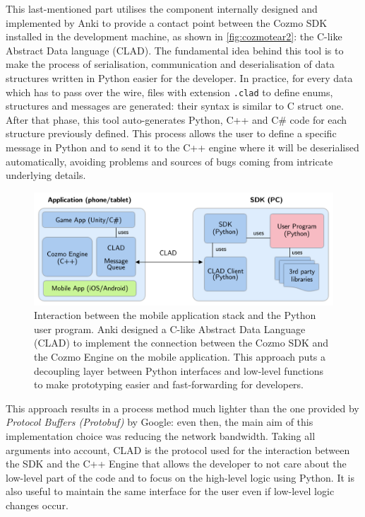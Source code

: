 This last-mentioned part utilises the component internally designed and implemented by Anki to provide a contact point between the Cozmo SDK installed in the development machine, as shown in \vref{fig:cozmotear2}: the C-like Abstract Data language (CLAD).
The fundamental idea behind this tool is to make the process of serialisation, communication and deserialisation of data structures written in Python easier for the developer.
In practice, for every data which has to pass over the wire, files with extension \texttt{.clad} to define enums, structures and messages are generated: their syntax is similar to C struct one.
After that phase, this tool auto-generates Python, C++ and C\# code for each structure previously defined.
This process allows the user to define a specific message in Python and to send it to the C++ engine where it will be deserialised automatically, avoiding problems and sources of bugs coming from intricate underlying details.

\begin{figure}
	\centering
	\includegraphics[width=\textwidth]{img/cozmo-sw.png}
	\caption[Interaction Application/PC]{Interaction between the mobile application stack and the Python user program.
Anki designed a C-like Abstract Data Language (CLAD) to implement the connection between the Cozmo SDK and the Cozmo Engine on the mobile application.
This approach puts a decoupling layer between Python interfaces and low-level functions to make prototyping easier and fast-forwarding for developers.
\cite{mellon2017cognitive}}
	\label{fig:cozmotear2}
\end{figure}

This approach results in a process method much lighter than the one provided by \textit{Protocol Buffers (Protobuf)} by Google: even then, the main aim of this implementation choice was reducing the network bandwidth.
Taking all arguments into account, CLAD is the protocol used for the interaction between the SDK and the C++ Engine that allows the developer to not care about the low-level part of the code and to focus on the high-level logic using Python.
It is also useful to maintain the same interface for the user even if low-level logic changes occur.

